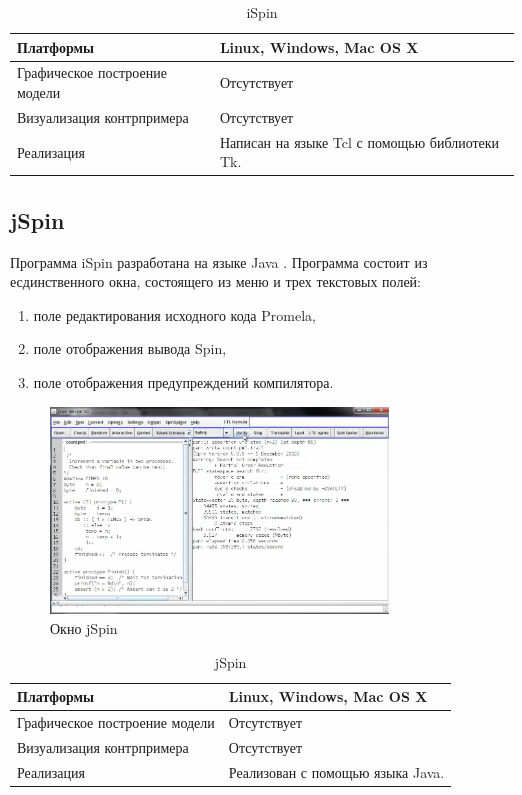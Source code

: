 \begin{table}[ht]
	\caption{iSpin}\label{tab:ispin}
	\centering
	\begin{tabular}{|m{2.5 cm}|m{7.5 cm}|}
	\hline
	Платформы & Linux, Windows, Mac OS X \\
	\hline
	Графическое построение модели &Отсутствует \\
	\hline
	Визуализация контрпримера & Отсутствует \\
	\hline
	Реализация & Написан на языке Tcl с помощью библиотеки Tk.\\
	\hline
	\end{tabular}
\end{table}

\subsection{jSpin}

Программа iSpin разработана на языке Java \cite{spin}. Программа состоит из есдинственного окна, состоящего из меню и трех текстовых полей:

\begin{enumerate}
	\item поле редактирования исходного кода Promela,
	\item поле отображения вывода Spin,
	\item поле отображения предупреждений компилятора.
\end{enumerate}


\begin{figure}[htbp]
	\centering
	\includegraphics[width=0.8\textwidth]{fig/jspin.png}
	\caption{Окно jSpin}
	\label{fig:jspin}
\end{figure}

\begin{table}[ht]
	\caption{jSpin}\label{tab:jspin}
	\centering
	\begin{tabular}{|m{2.5 cm}|m{7.5 cm}|}
		\hline
		Платформы & Linux, Windows, Mac OS X \\
		\hline
		Графическое построение модели &Отсутствует \\
		\hline
		Визуализация контрпримера & Отсутствует \\
		\hline
		Реализация & Реализован с помощью языка Java.\\
		\hline
	\end{tabular}
\end{table}

